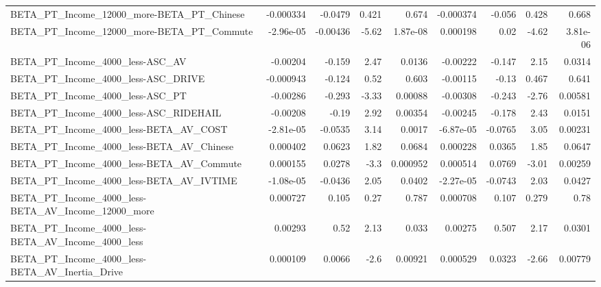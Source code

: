 \begin{tabular}{lrrrrrrrr}
BETA\_PT\_Income\_12000\_more-BETA\_PT\_Chinese          &   -0.000334 &      -0.0479 &    0.421 &    0.674 &  -0.000374 &      -0.056 &        0.428 &         0.668 \\
BETA\_PT\_Income\_12000\_more-BETA\_PT\_Commute          &   -2.96e-05 &     -0.00436 &    -5.62 & 1.87e-08 &   0.000198 &        0.02 &        -4.62 &      3.81e-06 \\
BETA\_PT\_Income\_4000\_less-ASC\_AV                    &    -0.00204 &       -0.159 &     2.47 &   0.0136 &   -0.00222 &      -0.147 &         2.15 &        0.0314 \\
BETA\_PT\_Income\_4000\_less-ASC\_DRIVE                 &   -0.000943 &       -0.124 &     0.52 &    0.603 &   -0.00115 &       -0.13 &        0.467 &         0.641 \\
BETA\_PT\_Income\_4000\_less-ASC\_PT                    &    -0.00286 &       -0.293 &    -3.33 &  0.00088 &   -0.00308 &      -0.243 &        -2.76 &       0.00581 \\
BETA\_PT\_Income\_4000\_less-ASC\_RIDEHAIL              &    -0.00208 &        -0.19 &     2.92 &  0.00354 &   -0.00245 &      -0.178 &         2.43 &        0.0151 \\
BETA\_PT\_Income\_4000\_less-BETA\_AV\_COST              &   -2.81e-05 &      -0.0535 &     3.14 &   0.0017 &  -6.87e-05 &     -0.0765 &         3.05 &       0.00231 \\
BETA\_PT\_Income\_4000\_less-BETA\_AV\_Chinese           &    0.000402 &       0.0623 &     1.82 &   0.0684 &   0.000228 &      0.0365 &         1.85 &        0.0647 \\
BETA\_PT\_Income\_4000\_less-BETA\_AV\_Commute           &    0.000155 &       0.0278 &     -3.3 & 0.000952 &   0.000514 &      0.0769 &        -3.01 &       0.00259 \\
BETA\_PT\_Income\_4000\_less-BETA\_AV\_IVTIME            &   -1.08e-05 &      -0.0436 &     2.05 &   0.0402 &  -2.27e-05 &     -0.0743 &         2.03 &        0.0427 \\
BETA\_PT\_Income\_4000\_less-BETA\_AV\_Income\_12000\_more &    0.000727 &        0.105 &     0.27 &    0.787 &   0.000708 &       0.107 &        0.279 &          0.78 \\
BETA\_PT\_Income\_4000\_less-BETA\_AV\_Income\_4000\_less  &     0.00293 &         0.52 &     2.13 &    0.033 &    0.00275 &       0.507 &         2.17 &        0.0301 \\
BETA\_PT\_Income\_4000\_less-BETA\_AV\_Inertia\_Drive     &    0.000109 &       0.0066 &     -2.6 &  0.00921 &   0.000529 &      0.0323 &        -2.66 &       0.00779 \\

\end{tabular}
